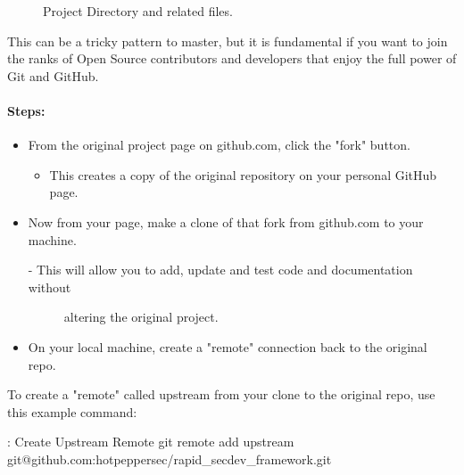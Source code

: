 \begin{figure}
	\centering
	\caption{Project Directory and related files.}
\end{figure}

This can be a tricky pattern to master, but it is fundamental if you
want to join the ranks of Open Source contributors and developers that
enjoy the full power of Git and GitHub.


\paragraph{Steps:}

\begin{itemize}

\item
  From the original project page on github.com, click the "fork" button.

  \begin{itemize}

  \item
    This creates a copy of the original repository on your personal
    GitHub page.
  \end{itemize}
\item
  Now from your page, make a clone of that fork from github.com to your
  machine.

  \begin{description}
  \item[- This will allow you to add, update and test code and
  documentation without]
  altering the original project.
  \end{description}
\item
  On your local machine, create a "remote" connection back to the
  original repo.
\end{itemize}

To create a "remote" called upstream from your clone to the original
repo, use this example command:

\begin{mybox}{\thetcbcounter: Create Upstream Remote}
git remote add upstream git@github.com:hotpeppersec/rapid\_secdev\_framework.git
\end{mybox}

